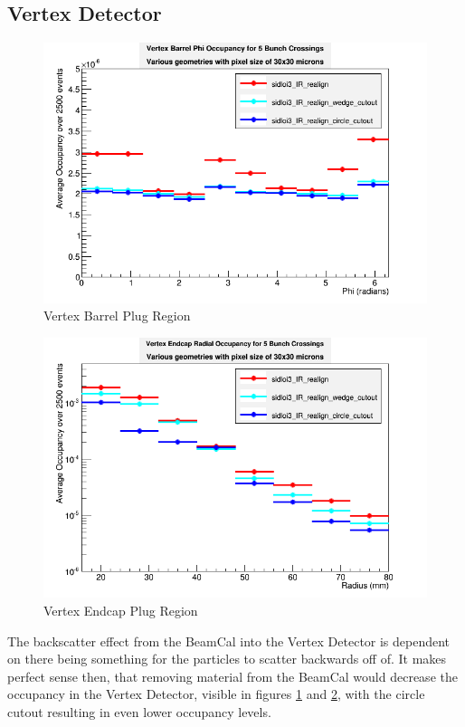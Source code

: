 \documentclass{report}
\begin{document}
            \subsection{Vertex Detector} 
                \begin{figure}[H] 
                    \includegraphics[width=\textwidth]{VradOccupancy_plug_brl}
                    \centering
                    \caption{Vertex Barrel Plug Region}
                    \label{plug_vertex_brl}
                \end{figure}
                \begin{figure}[H] 
                    \includegraphics[width=\textwidth]{VradOccupancy_plug_ecp}
                    \centering
                    \caption{Vertex Endcap Plug Region}
                    \label{plug_vertex_ecp}
                \end{figure}
                The backscatter effect from the BeamCal into the Vertex Detector is dependent on there being something for the particles to scatter backwards off of. It makes perfect sense then, that removing material from the BeamCal would decrease the occupancy in the Vertex Detector, visible in figures \ref{plug_vertex_brl} and \ref{plug_vertex_ecp}, with the circle cutout resulting in even lower occupancy levels.
                
\end{document}
